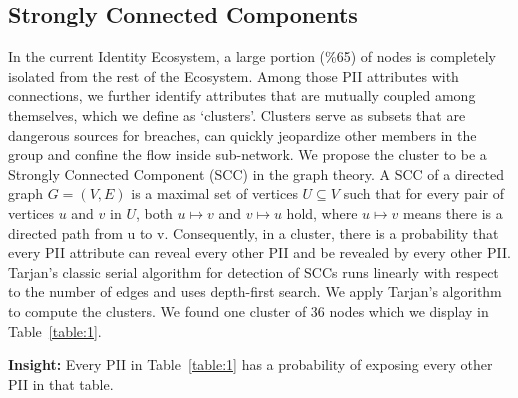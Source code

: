 \documentclass[conference]{IEEEtran}
\begin{document}
\subsection{Strongly Connected Components}
In the current Identity Ecosystem, a large portion (\%65) of nodes is completely isolated from the rest of the Ecosystem. Among those PII attributes with connections, we further identify attributes that are mutually coupled among themselves, which we define as `clusters'. Clusters serve as subsets that are dangerous sources for breaches, can quickly jeopardize other members in the group and confine the flow inside sub-network. 
We propose the cluster to be a Strongly Connected Component (SCC) in the graph theory. A SCC of a directed graph $G = (V, E)$ is a maximal set of vertices $U \subseteq V$ such that for every pair of vertices $u$ and $v$ in $U$, both $u \mapsto v$ and $v \mapsto u$ hold, where $u \mapsto v$ means there is a directed path from u to v. Consequently, in a cluster, there is a probability that every PII attribute can reveal every other PII and be revealed by every other PII. Tarjan's classic serial algorithm for detection of SCCs runs linearly with respect to the number of edges and uses depth-first search. We apply  Tarjan's algorithm \cite{Tarjan} to compute the clusters. We found one cluster of 36 nodes which we display in Table~\ref{table:1}.

{\bf Insight:} Every PII in Table~\ref{table:1} has a probability of exposing every other PII in that table. 
\end{document}
